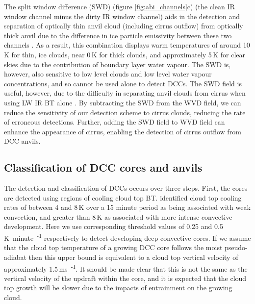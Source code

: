 The split window difference (SWD) (figure \ref{fig:abi_channels}c) (the clean IR window channel minus the dirty IR window channel) aids in the detection and separation of optically thin anvil cloud (including cirrus outflow) from optically thick anvil due to the difference in ice particle emissivity between these two channels \citep{heidinger_gazing_2009}.
As a result, this combination displays warm temperatures of around 10\,\unit{K} for thin, ice clouds, near 0\,\unit{K} for thick clouds, and approximately 5\,\unit{K} for clear skies due to the contribution of boundary layer water vapour.
The SWD is, however, also sensitive to low level clouds and low level water vapour concentrations, and so cannot be used alone to detect DCCs.
The SWD field is useful, however, due to the difficulty in separating anvil clouds from cirrus when using LW IR BT alone \citep{hong_detection_2005}. 
By subtracting the SWD from the WVD field, we can reduce the sensitivity of our detection scheme to cirrus clouds, reducing the rate of erroneous detections.
Further, adding the SWD field to WVD field can enhance the appearance of cirrus, enabling the detection of cirrus outflow  from DCC anvils.

\subsection{Classification of DCC cores and anvils}

The detection and classification of DCCs occurs over three steps.
First, the cores are detected using regions of cooling cloud top BT.
\citet{roberts_nowcasting_2003} identified cloud top cooling rates of between 4 and 8\,\unit{K} over a 15 minute period as being associated with weak convection, and greater than 8\,\unit{K} as associated with more intense convective development.
Here we use corresponding threshold values of 0.25 and 0.5\,\unit{K minute\textsuperscript{-1}} respectively to detect developing deep convective cores.
If we assume that the cloud top temperature of a growing DCC core follows the moist pseudo-adiabat then this upper bound is equivalent to a cloud top vertical velocity of approximately 1.5\,\unit{ms\textsuperscript{-1}}.
It should be made clear that this is not the same as the vertical velocity of the updraft within the core, and it is expected that the cloud top growth will be slower due to the impacts of entrainment on the growing cloud.

